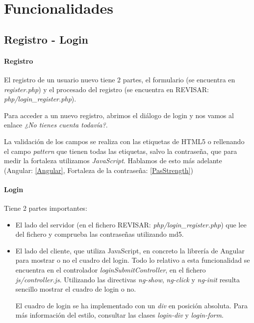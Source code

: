 \documentclass{apuntes}
\begin{document}
\section{Funcionalidades}

\subsection{Registro - Login}

\paragraph{Registro}

El registro de un usuario nuevo tiene 2 partes, el formulario (se encuentra en \textit{register.php}) y el procesado del registro (se encuentra en REVISAR: \textit{php/login\_register.php}).

Para acceder a un nuevo registro, abrimos el diálogo de login y nos vamos al enlace \textit{¿No tienes cuenta todavía?}. 

La validación de los campos se realiza con las etiquetas de HTML5 o rellenando el campo \textit{pattern} que tienen todas las etiquetas, salvo la contraseña, que para medir la fortaleza utilizamos \textit{JavaScript}. Hablamos de esto más adelante (Angular: \ref{Angular}, Fortaleza de la contraseña: \ref{PasStrength})

\paragraph{Login}

Tiene 2 partes importantes:

\begin{itemize}

\item El lado del servidor (en el fichero REVISAR: \textit{php/login\_register.php}) que lee del fichero y comprueba las contraseñas utilizando md5.

\item El lado del cliente, que utiliza JavaScript, en concreto la librería de Angular para mostrar o no el cuadro del login. Todo lo relativo a esta funcionalidad se encuentra en el controlador \textit{loginSubmitController}, en el fichero \textit{js/controller.js}. Utilizando las directivas \textit{ng-show}, \textit{ng-click} y \textit{ng-init} resulta sencillo mostrar el cuadro de login o no. 

El cuadro de login se ha implementado con un \textit{div} en posición absoluta. Para más información del estilo, consultar las clases \textit{login-div} y \textit{login-form}.

\end{itemize}
\end{document}
